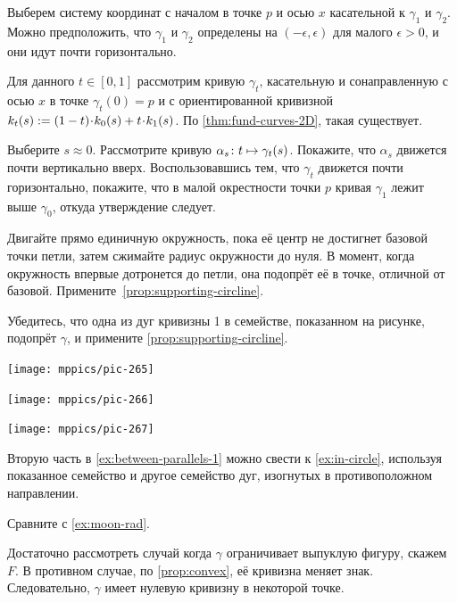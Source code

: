 \begin{multicols}{2}
Выберем систему координат с началом в точке $p$ и осью $x$ касательной к $\gamma_1$ и $\gamma_2$.
Можно предположить, что $\gamma_1$ и $\gamma_2$ определены на $(-\epsilon,\epsilon)$ для малого $\epsilon>0$,
и они идут почти горизонтально.

Для данного $t\in[0,1]$ рассмотрим кривую $\gamma_t$, касательную и сонаправленную с осью $x$ в точке $\gamma_t(0)=p$ и с ориентированной кривизной $\skur_t(s)\z\df(1\z-t)\cdot\skur_0(s)+t\cdot\skur_1(s)$.
По \ref{thm:fund-curves-2D}, такая существует.

Выберите $s\approx 0$.
Рассмотрите кривую $\alpha_s\:t\z\mapsto \gamma_t(s)$.
Покажите, что $\alpha_s$ движется почти вертикально вверх.
Воспользовавшись тем, что $\gamma_t$ движется почти горизонтально, покажите, что в малой окрестности точки $p$ кривая $\gamma_1$ лежит выше $\gamma_0$,
откуда утверждение следует.

Двигайте прямо единичную окружность, пока её центр не достигнет базовой точки петли, затем сжимайте радиус окружности до нуля.
В момент, когда окружность впервые дотронется до петли, она подопрёт её в точке, отличной от базовой.
Примените~\ref{prop:supporting-circline}.

Убедитесь, что одна из дуг кривизны 1 в семействе, показанном на рисунке, подопрёт $\gamma$, и примените \ref{prop:supporting-circline}.

\begin{Figure}
\begin{minipage}{.35\textwidth}
\centering
\texttt{[image: mppics/pic-265]}
\end{minipage}
\hfill
\begin{minipage}{.3\textwidth}
\centering
\texttt{[image: mppics/pic-266]}
\end{minipage}
\hfill
\begin{minipage}{.25\textwidth}
\centering
\texttt{[image: mppics/pic-267]}
\end{minipage}
\end{Figure}

Вторую часть в \ref{ex:between-parallels-1} можно свести к \ref{ex:in-circle}, используя показанное семейство и другое семейство дуг, изогнутых в противоположном направлении.

Сравните с \ref{ex:moon-rad}.

Достаточно рассмотреть случай когда $\gamma$ ограничивает выпуклую фигуру, скажем~$F$.
В противном случае, по \ref{prop:convex}, её кривизна меняет знак.
Следовательно, $\gamma$ имеет нулевую кривизну в некоторой точке.



\end{multicols}

